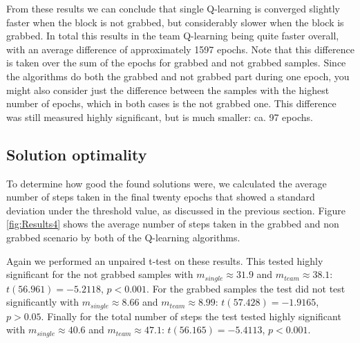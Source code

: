 From these results we can conclude that single Q-learning is converged slightly faster when the block is not grabbed, but considerably slower when the block is grabbed. In total this results in the team Q-learning being quite faster overall, with an average difference of approximately 1597 epochs. Note that this difference is taken over the sum of the epochs for grabbed and not grabbed samples. Since the algorithms do both the grabbed and not grabbed part during one epoch, you might also consider just the difference between the samples with the highest number of epochs, which in both cases is the not grabbed one. This difference was still measured highly significant, but is much smaller: ca. 97 epochs.

\subsection{Solution optimality}
To determine how good the found solutions were, we calculated the average number of steps taken in the final twenty epochs that showed a standard deviation under the threshold value, as discussed in the previous section. Figure \ref{fig:Results4} shows the average number of steps taken in the grabbed and non grabbed scenario by both of the Q-learning algorithms.

Again we performed an unpaired t-test on these results. This tested highly significant for the not grabbed samples with $m_{single} \approx 31.9$ and $m_{team} \approx 38.1$: $t(56.961) = -5.2118$, $p < 0.001$. For the grabbed samples the test did not test significantly with $m_{single} \approx 8.66$ and $m_{team} \approx 8.99$: $t(57.428) = -1.9165$, $p > 0.05$. Finally for the total number of steps the test tested highly significant with $m_{single} \approx 40.6$ and $m_{team} \approx 47.1$: $t(56.165) = -5.4113$, $p < 0.001$.

